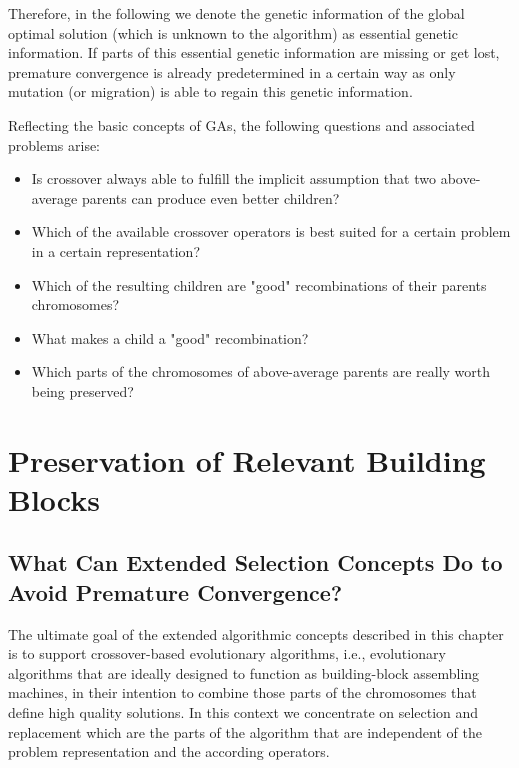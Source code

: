 \documentclass[12pt]{book}
\begin{document}
Therefore, in the following we denote the genetic information of the global optimal solution (which is unknown to the algorithm) as essential genetic information. If parts of this essential genetic information are missing or get lost, premature convergence is already predetermined in a certain way as only mutation (or migration) is able to regain this genetic information.

Reflecting the basic concepts of GAs, the following questions and associated problems arise:
\begin{itemize}
\item Is crossover always able to fulfill the implicit assumption that two above-average parents can produce even better children?
\item Which of the available crossover operators is best suited for a certain problem in a certain representation?
\item Which of the resulting children are "good" recombinations of their parents chromosomes?
\item What makes a child a "good" recombination?
\item Which parts of the chromosomes of above-average parents are really worth being preserved?
\end{itemize}
\clearpage

\chapter{Preservation of Relevant Building Blocks}
\section{What Can Extended Selection Concepts Do to Avoid Premature Convergence?}
The ultimate goal of the extended algorithmic concepts described in this chapter is to support crossover-based evolutionary algorithms, i.e., evolutionary algorithms that are ideally designed to function as building-block assembling machines, in their intention to combine those parts of the chromosomes that define high quality solutions. In this context we concentrate on selection and replacement which are the parts of the algorithm that are independent of the problem representation and the according operators.
\end{document}
